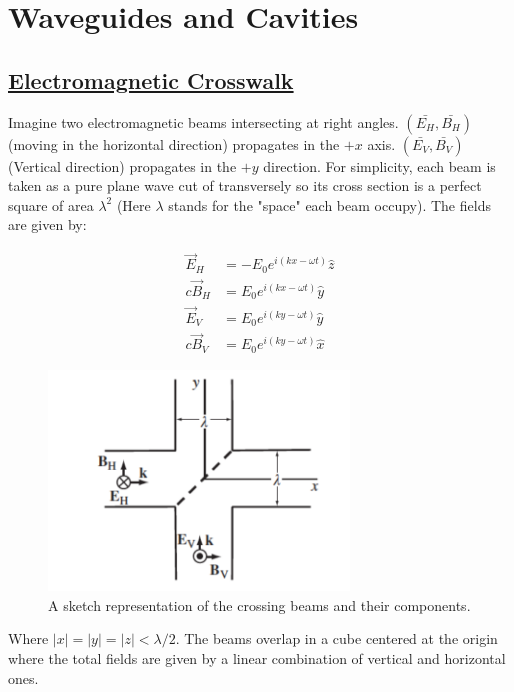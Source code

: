 \section{Waveguides and Cavities}

 \subsection{\hyperref[Electromagnetic Crosswalk]{Electromagnetic Crosswalk}}
 
Imagine two electromagnetic beams intersecting at right angles. $(\bar{E_{H}},\bar{B_{H}})$ (moving in the horizontal direction) propagates in the $+x$ axis. $(\bar{E_{V}},\bar{B_{V}})$ (Vertical direction) propagates in the $+y$ direction. For simplicity, each beam is taken as a pure plane wave cut of transversely so its cross section is a perfect square of area $\lambda^{2}$ (Here $\lambda$ stands for the "space" each beam occupy). The fields are given by:
	
\begin{subequations}
\begin{align}
\vec{E}_{H} &= -E_{0} e^{i(kx - \omega t)} \hat{z}\\
c \vec{B}_{H} &= E_{0} e^{i(kx - \omega t)} \hat{y}\\
\vec{E}_{V} &= E_{0} e^{i(ky - \omega t)} \hat{y}\\
c \vec{B}_{V} &= E_{0} e^{i(ky - \omega t)} \hat{x}
\end{align}
\end{subequations}

\begin{figure}[h]
	\includegraphics[width=8cm]{figures/crossbeams.png}
	\centering
	\caption{A sketch representation of the crossing beams and their components.}
\end{figure}

Where $\left|x\right|=\left|y\right|=\left|z\right|< \lambda/2$. The beams overlap in a cube centered at the origin where the total fields are given by a linear combination of vertical and horizontal ones.

